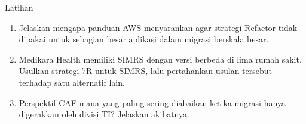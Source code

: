 \documentclass[aspectratio=169, table, 12pt]{beamer}
\begin{document}
\begin{frame}{Latihan}
  \begin{enumerate}
    \item Jelaskan mengapa panduan AWS menyarankan agar strategi Refactor tidak dipakai
          untuk sebagian besar aplikasi dalam migrasi berskala besar.
    \item Medikara Health memiliki SIMRS dengan versi berbeda di lima rumah sakit.
          Usulkan strategi 7R untuk SIMRS, lalu pertahankan usulan tersebut terhadap satu
          alternatif lain.
    \item Perspektif CAF mana yang paling sering diabaikan ketika migrasi hanya
          digerakkan oleh divisi TI? Jelaskan akibatnya.
  \end{enumerate}
\end{frame}
\end{document}
